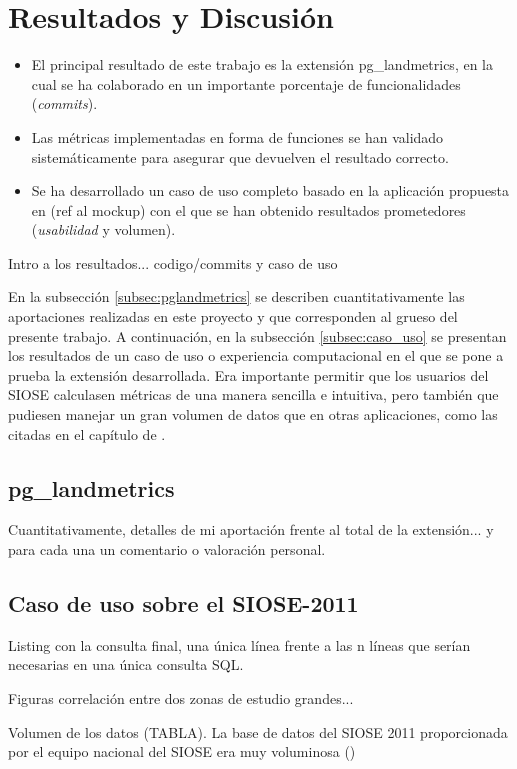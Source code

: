\chapter{Resultados y Discusión}\label{chap:result}

\begin{graybox}
\begin{itemize}
\item El principal resultado de este trabajo es la extensión pg\_landmetrics, en la cual se ha colaborado en un importante porcentaje de funcionalidades (\textit{commits}).
\item Las métricas implementadas en forma de funciones se han validado sistemáticamente para asegurar que devuelven el resultado correcto.
\item Se ha desarrollado un caso de uso completo basado en la aplicación propuesta en (ref al mockup) con el que se han obtenido resultados prometedores (\textit{usabilidad} y volumen).
\end{itemize}
\end{graybox}

Intro a los resultados... codigo/commits y caso de uso

En la subsección \ref{subsec:pglandmetrics} se describen cuantitativamente las aportaciones realizadas en este proyecto y que corresponden al grueso del presente trabajo. A continuación, en la subsección \ref{subsec:caso_uso} se presentan los resultados de un caso de uso o experiencia computacional en el que se pone a prueba la extensión desarrollada. Era importante permitir que los usuarios del SIOSE calculasen métricas de una manera sencilla e intuitiva, pero también que pudiesen manejar un gran volumen de datos que en otras aplicaciones, como las citadas en el capítulo de .

\section{pg\_landmetrics \label{sec:pglandmetrics}}

Cuantitativamente, detalles de mi aportación frente al total de la extensión... y para cada una un comentario o valoración personal.


\section{Caso de uso sobre el SIOSE-2011 \label{sec:caso_uso}}


Listing con la consulta final, una única línea frente a las n líneas que serían necesarias en una única consulta SQL.

Figuras correlación entre dos zonas de estudio grandes...


Volumen de los datos (TABLA). La base de datos del SIOSE 2011 proporcionada por el equipo nacional del SIOSE era muy voluminosa ()




